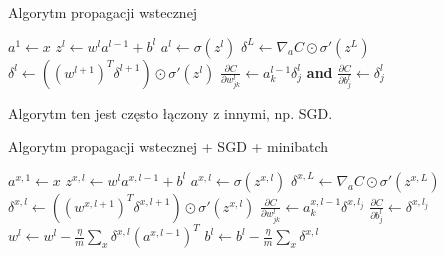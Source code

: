 \documentclass[10pt, oneside]{article}
\theoremstyle{remark}
\begin{document}
\begin{algorithm}
    \caption{Algorytm propagacji wstecznej}
    \label{alg:backprop}
    \begin{algorithmic}[1] %
            \State $a^1 \gets x$ 
            	 
            		\State $z^{l} \gets w^l a^{l-1}+b^l$
            		\State $a^{l} \gets \sigma(z^{l})$
            	\EndFor
            	\State $\delta^{L} \gets \nabla_a C \odot \sigma'(z^L)$ 
            	 
            		\State $\delta^{l} \gets ((w^{l+1})^T \delta^{l+1}) \odot \sigma'(z^{l})$         
            	\EndFor
            	\State \Return $\frac{\partial C}{\partial w^l_{jk}} \gets a^{l-1}_k \delta^l_j$ \textbf{and} $\frac{\partial C}{\partial b^l_j} \gets \delta^l_j$ 
        \EndFunction
    \end{algorithmic}
\end{algorithm}

Algorytm ten jest często łączony z innymi, np. SGD.

\begin{algorithm}
    \caption{Algorytm propagacji wstecznej + SGD + minibatch}
    \label{alg:backprop_sgf}
    \begin{algorithmic}[1] %
        		 
	            \State $a^{x,1} \gets x$ 
	            		\State $z^{x,l} \gets w^l a^{x,l-1}+b^l$
	            		\State $a^{x,l} \gets \sigma(z^{x,l})$
	            	\EndFor
	            	\State $\delta^{x,L} \gets \nabla_a C \odot \sigma'(z^{x,L})$
	            		\State $\delta^{x,l} \gets ((w^{x,l+1})^T \delta^{x,l+1}) \odot \sigma'(z^{x,l})$         
	            	\EndFor
	            	\State $\frac{\partial C}{\partial w^l_{jk}} \gets a^{x,l-1}_k \delta^{x,l_j}$
	            	\State $\frac{\partial C}{\partial b^l_j} \gets \delta^{x,l_j}$
	         \EndFor
	         	\State $w^l \gets w^l-\frac{\eta}{m} \sum_x \delta^{x,l} (a^{x,l-1})^T$
	         	\State $b^l \gets b^l-\frac{\eta}{m}
  \sum_x \delta^{x,l}$
	         \EndFor
        \EndFunction
    \end{algorithmic}
\end{algorithm}
\end{document}
